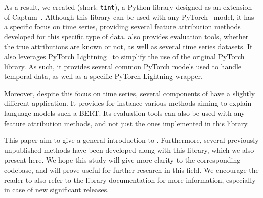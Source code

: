 As a result, we created \texttt{} (short: \texttt{tint}), a Python library designed as an
extension of Captum~\citep{kokhlikyan2020captum}.
Although this library can be used with any PyTorch~\citep{NEURIPS2019_9015} model, it has a specific focus on time series,
providing several feature attribution methods developed for this specific type of data.
\texttt{} also provides evaluation tools, whether the true attributions are known or not, as
well as several time series datasets.
It also leverages PyTorch Lightning~\citep{Falcon_PyTorch_Lightning_2019} to simplify the use of the original PyTorch
library.
As such, it provides several common PyTorch models used to handle temporal data, as well as a specific PyTorch Lightning
wrapper.

Moreover, despite this focus on time series, several components of \texttt{} have a slightly
different application.
It provides for instance various methods aiming to explain language models such a BERT\@.
Its evaluation tools can also be used with any feature attribution methods, and not just the ones implemented in
this library.

This paper aim to give a general introduction to \texttt{}.
Furthermore, several previously unpublished methods have been developed along with this library, which we also present
here.
We hope this study will give more clarity to the corresponding codebase, and will prove useful for further research
in this field.
We encourage the reader to also refer to the library documentation for more information, especially in case of
new significant releases.